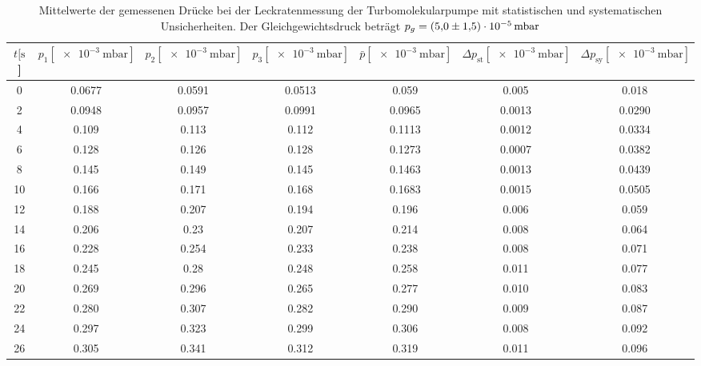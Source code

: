 \begin{table}[H]
    \centering
      \caption{Mittelwerte der gemessenen Drücke bei der Leckratenmessung der Turbomolekularpumpe mit statistischen und systematischen Unsicherheiten. Der Gleichgewichtsdruck beträgt $p_g=\SI{5 \pm 1.5 e-5}{\milli\bar}$}
      \label{tab:Turbo_Leck1}
      \small{
      \begin{tabular}{
        S[table-format=3.0] 
        S[table-format=1.4] S[table-format=1.4] S[table-format=1.4]
        S[table-format=1.4] S[table-format=1.4] S[table-format=1.3]
        }
        \toprule
        {$t [\si{\second}$]} &
        {$p_1 [\SI{e-3}{\milli\bar}]$} & {$p_2 [\SI{e-3}{\milli\bar}]$} & {$p_3 [\SI{e-3}{\milli\bar}]$} &
        {$\bar{p} [\SI{e-3}{\milli\bar}]$} & {$\Delta p_\text{st} [\SI{e-3}{\milli\bar}]$} & {$\Delta p_\text{sy} [\SI{e-3}{\milli\bar}]$}\\
            & 0.0677 & 0.0591 & 0.0513 & 0.059  & 0.005  & 0.018  \\
        2    & 0.0948 & 0.0957 & 0.0991 & 0.0965 & 0.0013 & 0.0290 \\
        4    & 0.109  & 0.113  & 0.112  & 0.1113 & 0.0012 & 0.0334 \\
        6    & 0.128  & 0.126  & 0.128  & 0.1273 & 0.0007 & 0.0382 \\
        8    & 0.145  & 0.149  & 0.145  & 0.1463 & 0.0013 & 0.0439 \\
        10   & 0.166  & 0.171  & 0.168  & 0.1683 & 0.0015 & 0.0505 \\
        12   & 0.188  & 0.207  & 0.194  & 0.196  & 0.006  & 0.059  \\
        14   & 0.206  & 0.23   & 0.207  & 0.214  & 0.008  & 0.064  \\
        16   & 0.228  & 0.254  & 0.233  & 0.238  & 0.008  & 0.071  \\
        18   & 0.245  & 0.28   & 0.248  & 0.258  & 0.011  & 0.077  \\
        20   & 0.269  & 0.296  & 0.265  & 0.277  & 0.010  & 0.083  \\
        22   & 0.280  & 0.307  & 0.282  & 0.290  & 0.009  & 0.087  \\
        24   & 0.297  & 0.323  & 0.299  & 0.306  & 0.008  & 0.092  \\
        26   & 0.305  & 0.341  & 0.312  & 0.319  & 0.011  & 0.096  \\

\end{tabular}}
\end{table}
